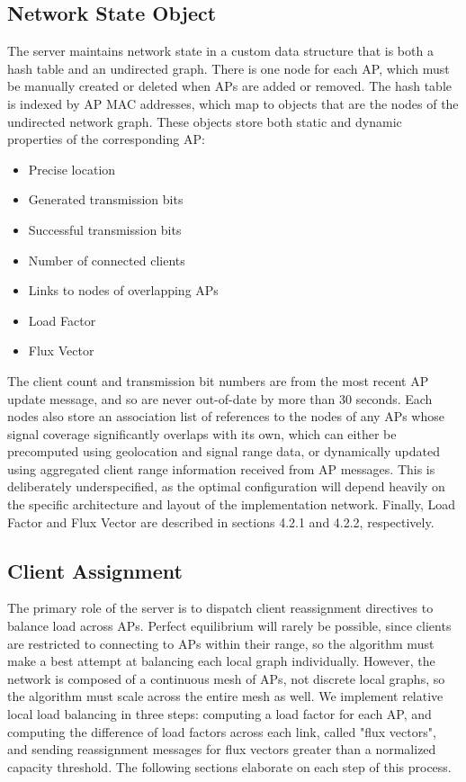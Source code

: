 \documentclass[10pt,journal,compsoc]{IEEEtran}
\begin{document}
		\subsection{Network State Object}
		The server maintains network state in a custom data structure that is both a hash table and an undirected graph. There is one node for each AP, which must be manually created or deleted when APs are added or removed. The hash table is indexed by AP MAC addresses, which map to objects that are the nodes of the undirected network graph. These objects store both static and dynamic properties of the corresponding AP:
		\begin{itemize}
			\item Precise location
			\item Generated transmission bits
			\item Successful transmission bits
			\item Number of connected clients
			\item Links to nodes of overlapping APs
			\item Load Factor
			\item Flux Vector
		\end{itemize}
		The client count and transmission bit numbers are from the most recent AP update message, and so are never out-of-date by more than 30 seconds. Each nodes also store an association list of references to the nodes of any APs whose signal coverage significantly overlaps with its own, which can either be precomputed using geolocation and signal range data, or dynamically updated using aggregated client range information received from AP messages. This is deliberately underspecified, as the optimal configuration will depend heavily on the specific architecture and layout of the implementation network. Finally, Load Factor and Flux Vector are described in sections 4.2.1 and 4.2.2, respectively.
		
		\subsection{Client Assignment}
		The primary role of the server is to dispatch client reassignment directives to balance load across APs. Perfect equilibrium will rarely be possible, since clients are restricted to connecting to APs within their range, so the algorithm must make a best attempt at balancing each local graph individually. However, the network is composed of a continuous mesh of APs, not discrete local graphs, so the algorithm must scale across the entire mesh as well. We implement relative local load balancing in three steps: computing a load factor for each AP, and computing the difference of load factors across each link, called "flux vectors", and sending reassignment messages for flux vectors greater than a normalized capacity threshold. The following sections elaborate on each step of this process.
		
\end{document}
